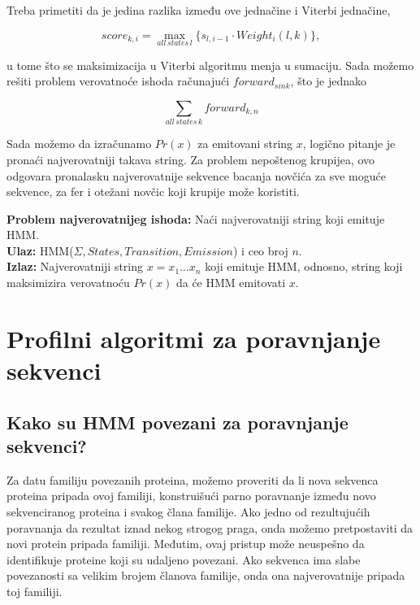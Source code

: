Treba primetiti da je jedina razlika između ove jednačine i Viterbi jednačine,

\begin{equation}
    score_{k, i} =  {\displaystyle \max_{all\,states\,l} \{s_{l, i-1} \cdot Weight_i(l, k)\}}, 
\end{equation}

u tome što se maksimizacija u Viterbi algoritmu menja u sumaciju. Sada možemo rešiti problem verovatnoće ishoda računajući $ forward_{sink} $, što je jednako

\begin{equation}
    {\displaystyle \sum_{all\,states\,k} forward_{k, n}}
\end{equation}

Sada možemo da izračunamo $ Pr(x) $ za emitovani string $ x $, logično pitanje je pronaći najverovatniji takava string. Za problem nepoštenog krupijea, ovo odgovara pronalasku najverovatnije sekvence bacanja novčića za sve moguće sekvence, za fer i otežani novčic koji krupije može koristiti.

\begin{tcolorbox}\textbf{Problem najverovatnijeg ishoda:}
    Naći najverovatniji string koji emituje HMM. \\
    \textbf{Ulaz:} HMM($ \Sigma, States, Transition, Emission $) i ceo broj $ n $.\\
    \textbf{Izlaz:} Najverovatniji string $ x = x_1...x_n $ koji emituje HMM, odnosno, string koji maksimizira verovatnoću $ Pr(x) $ da će HMM emitovati $ x $.
    
\end{tcolorbox}

\section{Profilni algoritmi za poravnjanje sekvenci}
\subsection{Kako su HMM povezani za poravnjanje sekvenci?}

Za datu familiju povezanih proteina, možemo proveriti da li nova sekvenca proteina pripada ovoj familiji, konstruišući parno poravnanje između novo sekvenciranog proteina i svakog člana familije. Ako jedno od rezultujućih poravnanja da rezultat iznad nekog strogog praga, onda možemo pretpostaviti da novi protein pripada familiji. Međutim, ovaj pristup može neuspešno da identifikuje proteine koji su udaljeno povezani. Ako sekvenca ima slabe povezanosti sa velikim brojem članova familije, onda ona najverovatnije pripada toj familiji.

